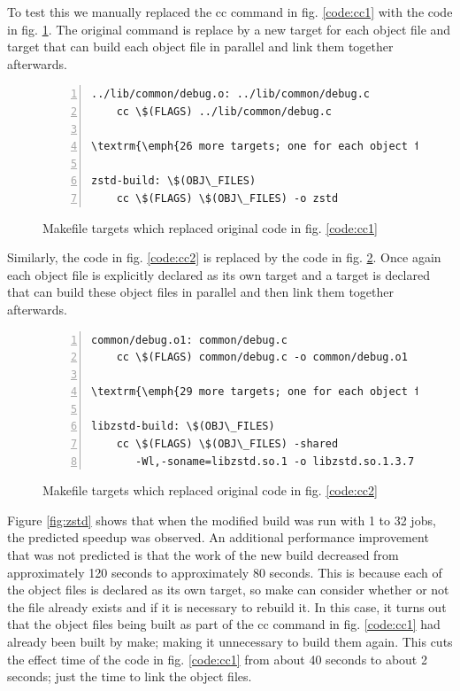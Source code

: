 \documentclass[sigconf,10pt,review,authorversion]{acmart}\settopmatter{printfolios=true,printccs=false,printacmref=false}
\begin{document}
To test this we manually replaced the cc command in fig. \ref{code:cc1} with the code in fig.
\ref{code:cc3}.  The original command is replace by a new target for each object file and target
that can build each object file in parallel and link them together afterwards.

\begin{figure}[H]
\begin{Verbatim}[commandchars=\\\{\},codes={\catcode`$=3\catcode`^=7\catcode`_=8},fontsize=\small,numbers=left,xleftmargin=5mm]
../lib/common/debug.o: ../lib/common/debug.c                                                       
    cc \$(FLAGS) ../lib/common/debug.c

\textrm{\emph{26 more targets; one for each object file}}

zstd-build: \$(OBJ\_FILES)
    cc \$(FLAGS) \$(OBJ\_FILES) -o zstd
\end{Verbatim}
\caption{Makefile targets which replaced original code in fig. \ref{code:cc1}}
\label{code:cc3}
\end{figure}

Similarly, the code in fig. \ref{code:cc2} is replaced by the code in fig. \ref{code:cc4}.  Once
again each object file is explicitly declared as its own target and a target is declared that can
build these object files in parallel and then link them together afterwards.

\begin{figure}[H]
  \begin{Verbatim}[commandchars=\\\{\},codes={\catcode`$=3\catcode`^=7\catcode`_=8},fontsize=\small,numbers=left,xleftmargin=5mm]
common/debug.o1: common/debug.c
    cc \$(FLAGS) common/debug.c -o common/debug.o1

\textrm{\emph{29 more targets; one for each object file}}

libzstd-build: \$(OBJ\_FILES)
    cc \$(FLAGS) \$(OBJ\_FILES) -shared
       -Wl,-soname=libzstd.so.1 -o libzstd.so.1.3.7
\end{Verbatim}
\caption{Makefile targets which replaced original code in fig. \ref{code:cc2}}
\label{code:cc4}
\end{figure}

Figure \ref{fig:zstd} shows that when the modified build was run with 1 to 32 jobs,
the predicted speedup was observed.  An additional performance improvement that was not predicted
is that the work of the new build decreased from approximately 120 seconds to approximately 80 seconds.
This is because each of the object files is declared as its own target, so make can consider whether
or not the file already exists and if it is necessary to rebuild it.  In this case, it turns out that
the object files being built as part of the cc command in fig. \ref{code:cc1} had already been built
by make; making it unnecessary to build them again.  This cuts the effect time of the code in fig.
\ref{code:cc1} from about 40 seconds to about 2 seconds; just the time to link the object files.
\end{document}
